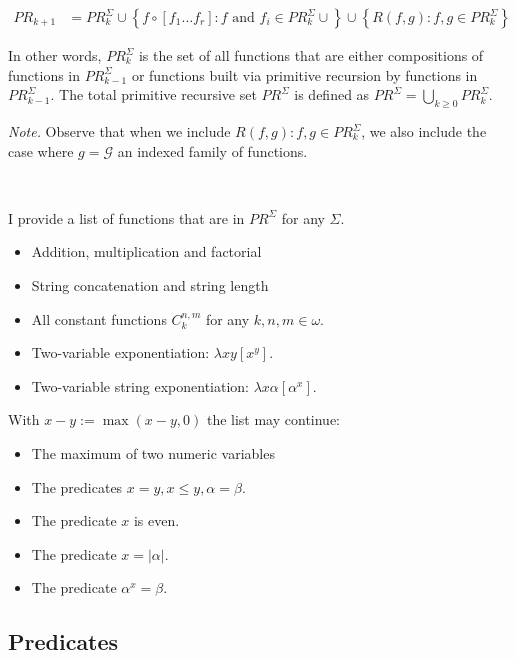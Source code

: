 \documentclass[a4paper, 12pt]{article}
\begin{document}
\begin{align*}
    PR_{k + 1} &= PR_{k}^{\Sigma} \cup \left\{ f \circ \left[ f_1\ldots f_r
    \right] : f \text{ and } f_i \in PR_{k}^{\Sigma} \cup  \right\} \cup \left\{
R(f, g) : f, g \in PR_{k}^{\Sigma}\right\} 
\end{align*}

In other words, $PR_{k}^{\Sigma}$ is the set of all functions that are either
compositions of functions in $PR_{k-1}^{\Sigma}$ or functions built via
primitive recursion by functions in $PR_{k-1}^{\Sigma}$. The total primitive
recursive set $PR^{\Sigma}$ is defined as $PR^{\Sigma} = \bigcup_{k \geq 0}
PR_{k}^{\Sigma}$.

\textit{Note.} Observe that when we include $R(f, g) : f, g \in
PR_{k}^{\Sigma}$, we also include the case where $g = \mathcal{G}$ an indexed
family of functions.



~ 

I provide a list of functions that are in $PR^{\Sigma}$ for any $\Sigma$.


\begin{itemize}
    \item Addition, multiplication and factorial 
    \item String concatenation and string length  
    \item All constant functions $C_k^{n, m}$ for any $k, n, m \in \omega$.
    \item Two-variable exponentiation: $\lambda xy\left[ x^y \right] $. 
    \item Two-variable string exponentiation: $\lambda x\alpha\left[ \alpha^x
        \right] $.
\end{itemize}

With $x - y := \max(x - y, 0)$ the list may continue: 

\begin{itemize}
    \item The maximum of two numeric variables 
    \item The predicates $x = y, x \leq y, \alpha = \beta$.
    \item The predicate $x$ is even. 
    \item The predicate $x = |\alpha|$. 
    \item The predicate $\alpha^x = \beta$.
\end{itemize}

\subsection{Predicates}
\end{document}
